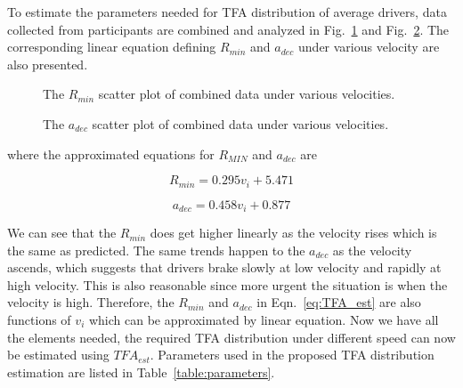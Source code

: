 To estimate the parameters needed for TFA distribution of average drivers, data collected from participants are combined and analyzed in Fig.~\ref{fig:CombRMINDifSpeed} and Fig.~\ref{fig:CombADECDifSpeed}. The corresponding linear equation defining $R_{min}$ and $a_{dec}$ under various velocity are also presented.

\begin{figure}[htbp!]
\begin{center}
\end{center}
\caption{The $R_{min}$ scatter plot of combined data under various velocities.}
\label{fig:CombRMINDifSpeed} 
\end{figure}

\begin{figure}[htbp!]
\begin{center}
\end{center}
\caption{The $a_{dec}$ scatter plot of combined data under various velocities.}
\label{fig:CombADECDifSpeed} 
\end{figure}

\noindent where the approximated  equations for $R_{MIN}$ and $a_{dec}$ are

\begin{equation}
R_{min} = 0.295 v_i + 5.471
\label{eq:RMIN_Linear}
\end{equation}

\begin{equation}
a_{dec} = 0.458 v_i + 0.877
\label{eq:ADEC_Linear}
\end{equation}


We can see that the $R_{min}$ does get higher linearly as the velocity rises which is the same as predicted. The same trends happen to the $a_{dec}$ as the velocity ascends, which suggests that drivers brake slowly at low velocity and rapidly at high velocity. This is also reasonable since more urgent the situation is when the velocity is high. Therefore, the $R_{min}$ and $a_{dec}$ in Eqn.~\ref{eq:TFA_est} are also functions of $v_i$ which can be approximated by linear equation. Now we have all the elements needed, the required TFA distribution under different speed can now be estimated using ${TFA}_{est}$. Parameters used in the proposed TFA distribution estimation are listed in Table~\ref{table:parameters}. 


